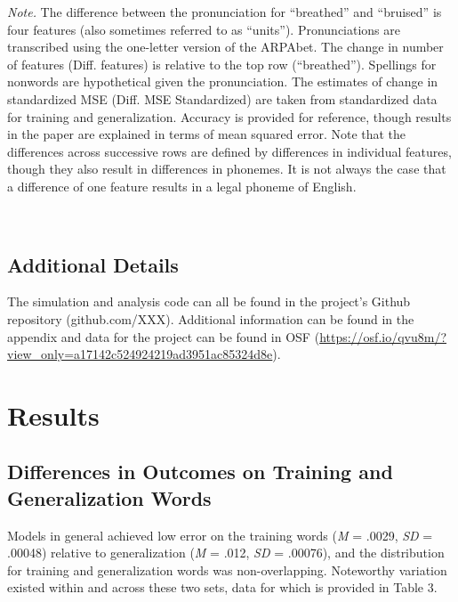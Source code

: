 \documentclass[
  ,man,floatsintext]{apa6}
\begin{document}
\emph{Note.} The difference between the pronunciation for ``breathed'' and ``bruised'' is four features (also sometimes referred to as ``units''). Pronunciations are transcribed using the one-letter version of the ARPAbet. The change in number of features (Diff. features) is relative to the top row (``breathed''). Spellings for nonwords are hypothetical given the pronunciation. The estimates of change in standardized MSE (Diff. MSE Standardized) are taken from standardized data for training and generalization. Accuracy is provided for reference, though results in the paper are explained in terms of mean squared error. Note that the differences across successive rows are defined by differences in individual features, though they also result in differences in phonemes. It is not always the case that a difference of one feature results in a legal phoneme of English.

~

\subsection{Additional Details}\label{additional-details}

The simulation and analysis code can all be found in the project's Github repository (github.com/XXX). Additional information can be found in the appendix and data for the project can be found in OSF (\url{https://osf.io/qvu8m/?view_only=a17142c524924219ad3951ac85324d8e}).

\section{Results}\label{results}

\subsection{Differences in Outcomes on Training and Generalization Words}\label{differences-in-outcomes-on-training-and-generalization-words}

Models in general achieved low error on the training words (\emph{M} = .0029, \emph{SD} = .00048) relative to generalization (\emph{M} = .012, \emph{SD} = .00076), and the distribution for training and generalization words was non-overlapping. Noteworthy variation existed within and across these two sets, data for which is provided in Table 3.
\end{document}

